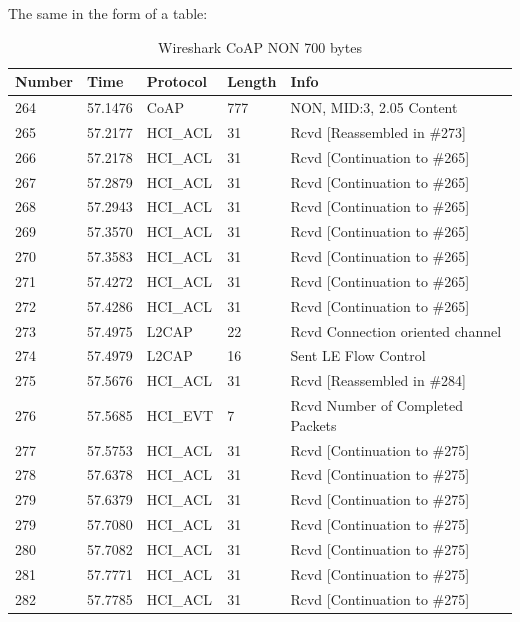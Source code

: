 The same in the form of a table: 

\begin{table}[]
\centering
\caption{Wireshark CoAP NON 700 bytes}
\label{coapNON700table}
\begin{tabular}{lllll}
\hline
Number & Time    & Protocol & Length & Info                             \\ \hline
264    & 57.1476 & CoAP     & 777    & NON, MID:3, 2.05 Content         \\
265    & 57.2177 & HCI\_ACL & 31     & Rcvd {[}Reassembled in \#273{]}  \\
266    & 57.2178 & HCI\_ACL & 31     & Rcvd {[}Continuation to \#265{]} \\
267    & 57.2879 & HCI\_ACL & 31     & Rcvd {[}Continuation to \#265{]} \\
268    & 57.2943 & HCI\_ACL & 31     & Rcvd {[}Continuation to \#265{]} \\
269    & 57.3570 & HCI\_ACL & 31     & Rcvd {[}Continuation to \#265{]} \\
270    & 57.3583 & HCI\_ACL & 31     & Rcvd {[}Continuation to \#265{]} \\
271    & 57.4272 & HCI\_ACL & 31     & Rcvd {[}Continuation to \#265{]} \\
272    & 57.4286 & HCI\_ACL & 31     & Rcvd {[}Continuation to \#265{]} \\
273    & 57.4975 & L2CAP    & 22     & Rcvd Connection oriented channel \\
274    & 57.4979 & L2CAP    & 16     & Sent LE Flow Control             \\
275    & 57.5676 & HCI\_ACL & 31     & Rcvd {[}Reassembled in \#284{]}  \\
276    & 57.5685 & HCI\_EVT & 7      & Rcvd Number of Completed Packets \\
277    & 57.5753 & HCI\_ACL & 31     & Rcvd {[}Continuation to \#275{]} \\
278    & 57.6378 & HCI\_ACL & 31     & Rcvd {[}Continuation to \#275{]} \\
279    & 57.6379 & HCI\_ACL & 31     & Rcvd {[}Continuation to \#275{]} \\
279    & 57.7080 & HCI\_ACL & 31     & Rcvd {[}Continuation to \#275{]} \\
280    & 57.7082 & HCI\_ACL & 31     & Rcvd {[}Continuation to \#275{]} \\
281    & 57.7771 & HCI\_ACL & 31     & Rcvd {[}Continuation to \#275{]} \\
282    & 57.7785 & HCI\_ACL & 31     & Rcvd {[}Continuation to \#275{]} \\

\end{tabular}
\end{table}
